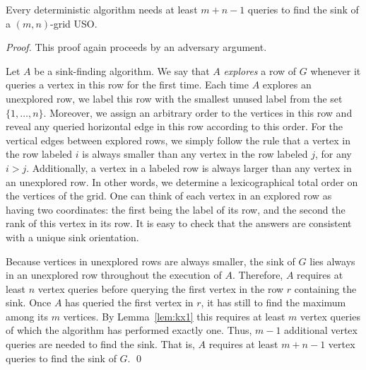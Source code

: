 \documentclass[runningheads,a4paper]{llncs}
\begin{document}
\begin{theorem} \label{thm:lowerbound}
Every deterministic algorithm needs at least $m+n-1$ queries to find the sink of a $(m,n)$-grid USO. 
\end{theorem}
\begin{proof}
    This proof again proceeds by an adversary argument.

Let $A$ be a sink-finding algorithm. We say that $A$ \emph{explores} a row of $G$ whenever it queries a vertex in this row for the first time.
Each time $A$ explores an unexplored row, we label this row with the smallest unused label from the set $\{1, \ldots, n\}$. Moreover, we assign an arbitrary order to the vertices in this row and reveal any queried horizontal edge in this row according to this order. For the vertical edges between explored rows, we simply follow the rule that a vertex in the row labeled $i$ is always smaller than any vertex in the row labeled $j$, for any $i > j$. Additionally, a vertex in a labeled row is always larger than any vertex in an unexplored row. In other words, we determine a lexicographical total order on the vertices of the grid. One can think of each vertex in an explored row as having two coordinates: the first being the label of its row, and the second the rank of this vertex in its row.
It is easy to check that the answers are consistent with a unique sink orientation.

Because vertices in unexplored rows are always smaller, the sink of $G$ lies always in an unexplored row throughout the execution of $A$. Therefore, $A$ requires at least $n$ vertex queries before querying the first vertex in the row $r$ containing the sink. Once $A$ has queried the first vertex in $r$, it has still to find the maximum among its $m$ vertices. 
By Lemma~\ref{lem:kx1} this requires at least $m$ vertex queries of which the algorithm has performed exactly one. Thus, $m-1$ additional vertex queries are needed to find the sink. That is, $A$ requires at least $m+n-1$ vertex queries to find the sink of $G$. \qed
\end{proof}
\end{document}
